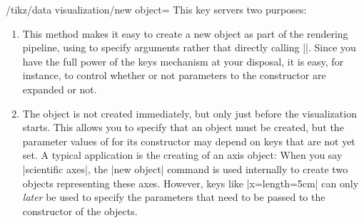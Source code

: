 \begin{key}{/tikz/data visualization/new object=}
  This key servers two purposes:
  \begin{enumerate}
  \item 
    This method makes it easy to create a new object as part of the
    rendering pipeline, using  to specify arguments rather
    that directly calling |\pgfoonew|. Since you have the full power
    of the keys mechanism at your disposal, it is easy, for instance,
    to control whether or not parameters to the constructor are
    expanded or not.
  \item
    The object is not created immediately, but only just before the
    visualization starts. This allows you to specify that an object
    must be created, but the parameter values of for its constructor
    may depend on keys that are not yet set. A typical application is
    the creating of an axis object: When you say |scientific axes|,
    the |new object| command is used internally to create two
    objects representing these axes. However, keys like
    |x={length=5cm}| can only \emph{later} be used to specify the
    parameters that need to be passed to the constructor of the
    objects. 
  \end{enumerate}


\end{key}
